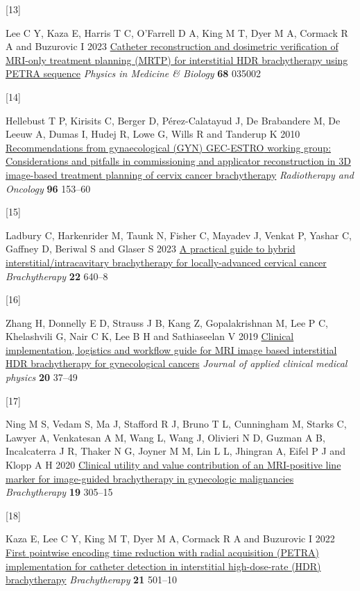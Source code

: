 \documentclass[
  11pt,
]{article}
\newlength{\cslhangindent}
\newlength{\csllabelwidth}
\newenvironment{CSLReferences}[2] %
 {\begin{list}{}{%
  \setlength{\itemindent}{0pt}
  \setlength{\leftmargin}{0pt}
  \setlength{\parsep}{0pt}
  \ifodd #1
   \setlength{\leftmargin}{\cslhangindent}
   \setlength{\itemindent}{-1\cslhangindent}
  \fi
  \setlength{\itemsep}{#2\baselineskip}}}
 {\end{list}}
\newcommand{\CSLLeftMargin}[1]{\parbox[t]{\csllabelwidth}{\strut#1\strut}}
\newcommand{\CSLRightInline}[1]{\parbox[t]{\linewidth - \csllabelwidth}{\strut#1\strut}}
\begin{document}
\begin{CSLReferences}{0}{1}
\CSLLeftMargin{{[}13{]} }%
\CSLRightInline{Lee C Y, Kaza E, Harris T C, O'Farrell D A, King M T,
Dyer M A, Cormack R A and Buzurovic I 2023
\href{https://doi.org/10.1088/1361-6560/acaf48}{Catheter reconstruction
and dosimetric verification of {MRI}-only treatment planning ({MRTP})
for interstitial {HDR} brachytherapy using {PETRA} sequence}
\emph{Physics in Medicine \& Biology} \textbf{68} 035002}

\CSLLeftMargin{{[}14{]} }%
\CSLRightInline{Hellebust T P, Kirisits C, Berger D, Pérez-Calatayud J,
De Brabandere M, De Leeuw A, Dumas I, Hudej R, Lowe G, Wills R and
Tanderup K 2010
\href{https://doi.org/10.1016/j.radonc.2010.06.004}{Recommendations from
gynaecological ({GYN}) {GEC-ESTRO} working group: Considerations and
pitfalls in commissioning and applicator reconstruction in {3D}
image-based treatment planning of cervix cancer brachytherapy}
\emph{Radiotherapy and Oncology} \textbf{96} 153--60}

\CSLLeftMargin{{[}15{]} }%
\CSLRightInline{Ladbury C, Harkenrider M, Taunk N, Fisher C, Mayadev J,
Venkat P, Yashar C, Gaffney D, Beriwal S and Glaser S 2023
\href{https://doi.org/10.1016/j.brachy.2023.07.001}{A practical guide to
hybrid interstitial/intracavitary brachytherapy for locally-advanced
cervical cancer} \emph{Brachytherapy} \textbf{22} 640--8}

\CSLLeftMargin{{[}16{]} }%
\CSLRightInline{Zhang H, Donnelly E D, Strauss J B, Kang Z,
Gopalakrishnan M, Lee P C, Khelashvili G, Nair C K, Lee B H and
Sathiaseelan V 2019 \href{https://doi.org/10.1002/acm2.12736}{Clinical
implementation, logistics and workflow guide for MRI image based
interstitial HDR brachytherapy for gynecological cancers} \emph{Journal
of applied clinical medical physics} \textbf{20} 37--49}

\CSLLeftMargin{{[}17{]} }%
\CSLRightInline{Ning M S, Vedam S, Ma J, Stafford R J, Bruno T L,
Cunningham M, Starks C, Lawyer A, Venkatesan A M, Wang L, Wang J,
Olivieri N D, Guzman A B, Incalcaterra J R, Thaker N G, Joyner M M, Lin
L L, Jhingran A, Eifel P J and Klopp A H 2020
\href{https://doi.org/10.1016/j.brachy.2019.12.005}{Clinical utility and
value contribution of an MRI-positive line marker for image-guided
brachytherapy in gynecologic malignancies} \emph{Brachytherapy}
\textbf{19} 305--15}

\CSLLeftMargin{{[}18{]} }%
\CSLRightInline{Kaza E, Lee C Y, King M T, Dyer M A, Cormack R A and
Buzurovic I 2022
\href{https://doi.org/10.1016/j.brachy.2022.01.003}{First pointwise
encoding time reduction with radial acquisition (PETRA) implementation
for catheter detection in interstitial high-dose-rate (HDR)
brachytherapy} \emph{Brachytherapy} \textbf{21} 501--10}


\end{CSLReferences}
\end{document}
